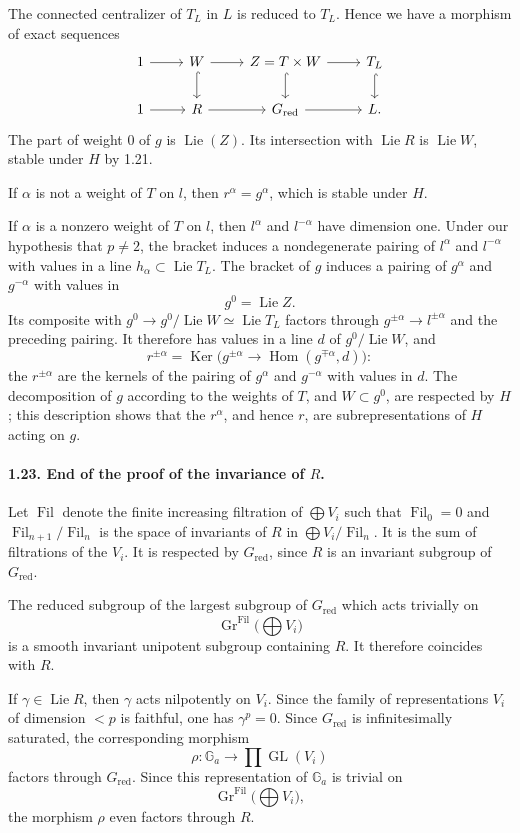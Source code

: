 \documentclass[11pt]{article}
\newcommand{\Ga}{\mathbb{G}_a}
\newcommand{\Lie}{\operatorname{Lie}}
\newcommand{\GL}{\operatorname{GL}}
\newcommand{\Hom}{\operatorname{Hom}}
\newcommand{\Ker}{\operatorname{Ker}}
\newcommand{\Fil}{\operatorname{Fil}}
\newcommand{\red}{\mathrm{red}}
\theoremstyle{plain}
\theoremstyle{definition}
\begin{document}
The connected centralizer of $T_L$ in $L$ is reduced to $T_L$. Hence we have a morphism of exact sequences
\[
\begin{tikzcd}
1 \arrow[r] & W \arrow[r] \arrow[d,hook] & Z=T\times W \arrow[r] \arrow[d,hook] & T_L \arrow[d,hook] \\
1 \arrow[r] & R \arrow[r] & G_{\red} \arrow[r] & L .
\end{tikzcd}
\]
The part of weight $0$ of $g$ is $\Lie(Z)$. Its intersection with $\Lie R$ is $\Lie W$, stable under $H$ by 1.21.

If $\alpha$ is not a weight of $T$ on $l$, then $r^\alpha=g^\alpha$, which is stable under $H$.

If $\alpha$ is a nonzero weight of $T$ on $l$, then $l^\alpha$ and $l^{-\alpha}$ have dimension one. Under our hypothesis that $p\ne2$, the bracket induces a nondegenerate pairing of $l^\alpha$ and $l^{-\alpha}$ with values in a line $h_\alpha\subset\Lie T_L$. The bracket of $g$ induces a pairing of $g^\alpha$ and $g^{-\alpha}$ with values in
\[
   g^0=\Lie Z.
\]
Its composite with $g^0\to g^0/\Lie W\simeq\Lie T_L$ factors through $g^{\pm\alpha}\to l^{\pm\alpha}$ and the preceding pairing. It therefore has values in a line $d$ of $g^0/\Lie W$, and
\[
   r^{\pm\alpha}=\Ker\bigl(g^{\pm\alpha}\to\Hom(g^{\mp\alpha},d)\bigr):
\]
the $r^{\pm\alpha}$ are the kernels of the pairing of $g^\alpha$ and $g^{-\alpha}$ with values in $d$. The decomposition of $g$ according to the weights of $T$, and $W\subset g^0$, are respected by $H$; this description shows that the $r^\alpha$, and hence $r$, are subrepresentations of $H$ acting on $g$.

\paragraph{1.23. End of the proof of the invariance of $R$.} Let $\Fil$ denote the finite increasing filtration of $\bigoplus V_i$ such that $\Fil_0=0$ and $\Fil_{n+1}/\Fil_n$ is the space of invariants of $R$ in $\bigoplus V_i/\Fil_n$. It is the sum of filtrations of the $V_i$. It is respected by $G_{\red}$, since $R$ is an invariant subgroup of $G_{\red}$.

The reduced subgroup of the largest subgroup of $G_{\red}$ which acts trivially on
\[
   \operatorname{Gr}^{\Fil}\bigl(\bigoplus V_i\bigr)
\]
is a smooth invariant unipotent subgroup containing $R$. It therefore coincides with $R$.

If $\gamma\in\Lie R$, then $\gamma$ acts nilpotently on $V_i$. Since the family of representations $V_i$ of dimension $<p$ is faithful, one has $\gamma^p=0$. Since $G_{\red}$ is infinitesimally saturated, the corresponding morphism
\[
   \rho:\Ga\longrightarrow \prod \GL(V_i)
\]
factors through $G_{\red}$. Since this representation of $\Ga$ is trivial on
\[
   \operatorname{Gr}^{\Fil}\bigl(\bigoplus V_i\bigr),
\]
the morphism $\rho$ even factors through $R$.
\end{document}
